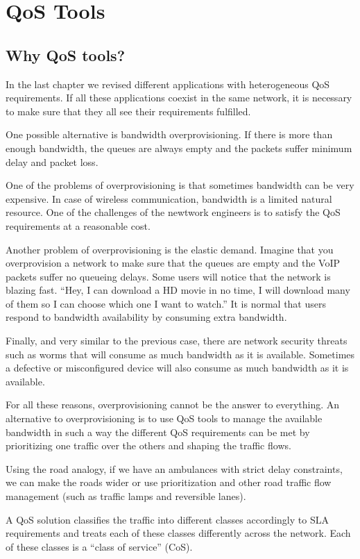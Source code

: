 \chapter{QoS Tools}
\section{Why QoS tools?}
In the last chapter we revised different applications with heterogeneous QoS requirements.
If all these applications coexist in the same network, it is necessary to make sure that they all see their requirements fulfilled.

One possible alternative is bandwidth overprovisioning.
If there is more than enough bandwidth, the queues are always empty and the packets suffer minimum delay and packet loss.

One of the problems of overprovisioning is that sometimes bandwidth can be very expensive.
In case of wireless communication, bandwidth is a limited natural resource.
One of the challenges of the newtwork engineers is to satisfy the QoS requirements at a reasonable cost.

Another problem of overprovisioning is the elastic demand.
Imagine that you overprovision a network to make sure that the queues are empty and the VoIP packets suffer no queueing delays.
Some users will notice that the network is blazing fast.
``Hey, I can download a HD movie in no time, I will download many of them so I can choose which one I want to watch.''
It is normal that users respond to bandwidth availability by consuming extra bandwidth.

Finally, and very similar to the previous case, there are network security threats such as worms that will consume as much bandwidth as it is available.
Sometimes a defective or misconfigured device will also consume as much bandwidth as it is available.

For all these reasons, overprovisioning cannot be the answer to everything.
An alternative to overprovisioning is to use QoS tools to manage the available bandwidth in such a way the different QoS requirements can be met by prioritizing one traffic over the others and shaping the traffic flows.

Using the road analogy, if we have an ambulances with strict delay constraints, we can make the roads wider or use prioritization and other road traffic flow management (such as traffic lamps and reversible lanes).

A QoS solution classifies the traffic into different classes accordingly to SLA requirements and treats each of these classes differently across the network.
Each of these classes is a ``class of service'' (CoS).

